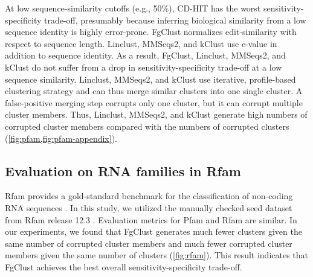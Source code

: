 \documentclass{bioinfo}
\begin{document}
At low sequence-similarity cutoffs (e.g., 50\%),
CD-HIT has the worst sensitivity-specificity trade-off, presumably because inferring biological similarity from a low sequence identity is highly error-prone.
FgClust normalizes edit-similarity with respect to sequence length.
Linclust, MMSeqs2, and kClust use e-value in addition to sequence identity.
As a result, FgClust, Linclust, MMSeqs2, and kClust do not suffer from a drop in sensitivity-specificity trade-off at a low sequence similarity.
Linclust, MMSeqs2, and kClust use iterative, profile-based clustering strategy and can thus merge similar clusters into one single cluster.
A false-positive merging step corrupts only one cluster, but it can corrupt multiple cluster members.
Thus, Linclust, MMSeqs2, and kClust generate high numbers of corrupted cluster members compared with the numbers of corrupted clusters (\cref{fig:pfam,fig:pfam-appendix}).



\subsection{Evaluation on RNA families in Rfam}

Rfam provides a gold-standard benchmark for the classification of non-coding RNA sequences \citep{nawrocki2014rfam}.
In this study, we utilized the manually checked seed dataset from Rfam release 12.3 \citep{nawrocki2014rfam}.
Evaluation metrics for Pfam and Rfam are similar.
In our experiments, we found that FgClust generates much fewer clusters given the same number of corrupted cluster members and much fewer corrupted cluster members given the same number of clusters (\cref{fig:rfam}).
This result indicates that FgClust achieves the best overall sensitivity-specificity trade-off.









\end{document}
